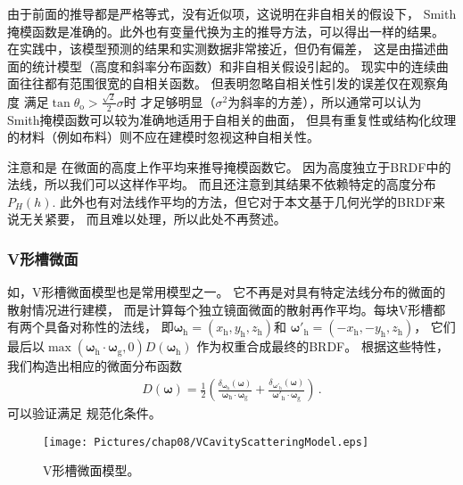 由于前面的推导都是严格等式，没有近似项，这说明在非自相关的假设下，
Smith掩模函数是准确的。此外也有变量代换为主的推导方法，可以得出一样的结果。
在实践中，该模型预测的结果和实测数据非常接近，但仍有偏差，
这是由描述曲面的统计模型（高度和斜率分布函数）和非自相关假设引起的。
现实中的连续曲面往往都有范围很宽的自相关函数。
但\citet{841905}表明忽略自相关性引发的误差仅在观察角度
满足$\tan\theta_{\mathrm{o}}>\frac{\sqrt{2}}{2}\sigma$时
才足够明显（$\sigma^2$为斜率的方差），所以通常可以认为
Smith掩模函数可以较为准确地适用于自相关的曲面，
但具有重复性或结构化纹理的材料（例如布料）则不应在建模时忽视这种自相关性。

注意和是
在微面的高度上作平均来推导掩模函数它。
因为高度独立于BRDF中的法线，所以我们可以这样作平均。
而且还注意到其结果不依赖特定的高度分布$P_H(h)$.
此外也有对法线作平均的方法，但它对于本文基于几何光学的BRDF来说无关紧要，
而且难以处理，所以此处不再赘述。


\subsubsection*{V形槽微面}
如，V形槽微面模型也是常用模型之一。
它不再是对具有特定法线分布的微面的散射情况进行建模，
而是计算每个独立镜面微面的散射再作平均。每块V形槽都有两个具备对称性的法线，
即${\bm\omega}_{\mathrm{h}}=(x_{\mathrm{h}},y_{\mathrm{h}},z_{\mathrm{h}})$和
${\bm\omega}'_{\mathrm{h}}=(-x_{\mathrm{h}},-y_{\mathrm{h}},z_{\mathrm{h}})$，
它们最后以$\max({\bm\omega}_{\mathrm{h}}\cdot{\bm\omega}_{\mathrm{g}},0)D({\bm\omega}_{\mathrm{h}})$
作为权重合成最终的BRDF。
根据这些特性，我们构造出相应的微面分布函数
\begin{align}\label{eq:08ex01-VCavityScatteringNormalDistribution}
    D({\bm\omega})=\frac{1}{2}\left(
    \frac{\delta_{{\bm\omega}_{\mathrm{h}}}({\bm\omega})}
    {{\bm\omega}_{\mathrm{h}}\cdot{\bm\omega}_{\mathrm{g}}}
    +\frac{\delta_{{\bm\omega}'_{\mathrm{h}}}({\bm\omega})}
    {{\bm\omega}'_{\mathrm{h}}\cdot{\bm\omega}_{\mathrm{g}}}\right)\, .
\end{align}
可以验证满足
规范化条件。

\begin{figure}[htbp]
    \centering
    \texttt{[image: Pictures/chap08/VCavityScatteringModel.eps]}
    \caption{V形槽微面模型。}
    \label{fig:08ex01-V-cavityScatteringModel}
\end{figure}

